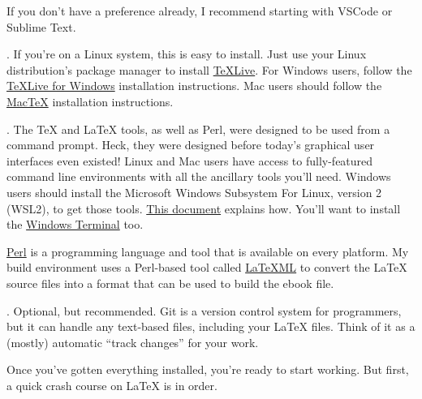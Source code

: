 \begin{description}
  If you don't have a preference already, I recommend starting with VSCode or
  Sublime Text.

\item [The \TeX{} and \LaTeX{} Toolset]. If you're on a Linux system, this is easy
  to install. Just use your Linux distribution's package manager to install
  \href{https://tug.org/texlive/}{TeXLive}. For Windows users, follow the
  \href{https://tug.org/texlive/windows.html}{TeXLive for Windows}
  installation instructions. Mac users should follow the
  \href{https://tug.org/mactex/}{MacTeX} installation instructions.

\item [Windows Subsystem for Linux (WSL)]. The \TeX{} and \LaTeX{} tools, as well
  as Perl, were designed to be used from a command prompt. Heck, they were
  designed before today's graphical user interfaces even existed! Linux and
  Mac users have access to fully-featured command line environments with all
  the ancillary tools you'll need. Windows users should install the Microsoft
  Windows Subsystem For Linux, version 2 (WSL2), to get those tools.
  \href{https://insaid.medium.com/setting-up-wsl-2-in-windows-10-87e819d08d2e}{This
    document} explains how. You'll want to install the
  \href{https://www.microsoft.com/en-us/p/windows-terminal/9n0dx20hk701}{Windows
    Terminal} too.

\item [Perl and LaTeXML] \href{https://www.perl.org/}{Perl} is a programming
  language and tool that is available on every platform. My build environment
  uses a Perl-based tool called \href{https://dlmf.nist.gov/LaTeXML/}{LaTeXML}
  to convert the \LaTeX{} source files into a format that can be used to build
  the ebook file. 

\item [Git]. Optional, but recommended. Git is a version control system for
  programmers, but it can handle any text-based files, including your \LaTeX
  files. Think of it as a (mostly) automatic ``track changes'' for your work.

\end{description}

Once you've gotten everything installed, you're ready to start working. But
first, a quick crash course on \LaTeX{} is in order.

